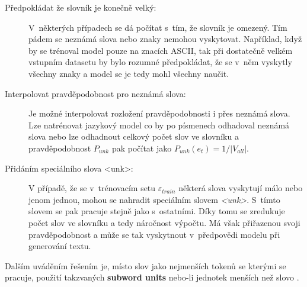 \begin{description}
  \item[Předpokládat že slovník je konečně velký:] V~některých případech se dá počítat s~tím, že slovník je omezený. Tím pádem se neznámá slova nebo znaky nemohou vyskytovat. Například, když by se trénoval model pouze na znacích ASCII, tak při dostatečně velkém vstupním datasetu by bylo rozumné předpokládat, že se v~něm vyskytly všechny znaky a model se je tedy mohl všechny naučit.
  \item[Interpolovat pravděpodobnost pro neznámá slova:] Je možné interpolovat rozložení pravděpodobnosti i přes neznámá slova. Lze natrénovat jazykový model co by po písmenech odhadoval neznámá slova nebo lze odhadnout celkový počet slov ve slovníku a pravděpodobnost $P_{unk}$ pak počítat jako $P_{unk}(e_t) = 1/|V_{all}|$.
  \item[Přidáním speciálního slova <unk>:]\label{description:unk}V případě, že se v~trénovacím setu $\varepsilon_{train}$ některá slova vyskytují málo nebo jenom jednou, mohou se nahradit speciálním slovem \emph{<unk>}. S~tímto slovem se pak pracuje stejně jako s~ostatními. Díky tomu se zredukuje počet slov ve slovníku a tedy náročnost výpočtu. Má však přiřazenou svoji pravděpodobnost a může se tak vyskytnout v~předpovědi modelu při generování textu.
\end{description}

Dalším uváděním řešením je, místo slov jako nejmenších tokenů se kterými se pracuje, použití takzvaných \textbf{subword units} nebo-li jednotek menších než slovo \cite{subwords}.

